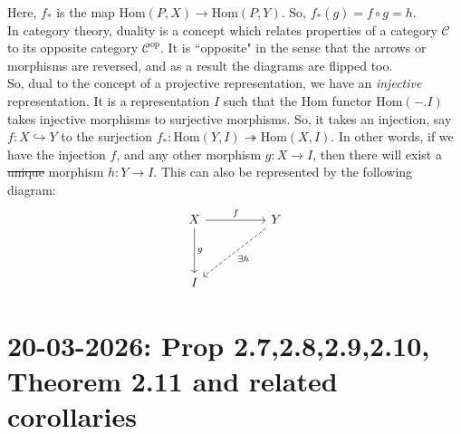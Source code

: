 \documentclass[12pt]{article}
\begin{document}
Here, $f_*$ is the map  $\text{Hom}(P,X) \to \text{Hom}(P,Y)$. So, $f_*(g)=f \circ g=h$. \\

 In category theory, duality is a concept which relates properties of a category $\mathscr{C}$ to its opposite category $\mathscr{C}^\text{op}$. It is ``opposite" in the sense that the arrows or morphisms are reversed, and as a result the diagrams are flipped too.\\

 So, dual to the concept of a projective representation, we have an \textit{injective} representation. It is a representation $I$ such that the Hom functor Hom$(-.I)$ takes injective morphisms to surjective morphisms. So, it takes an injection, say $f: X\hookrightarrow Y$ to the surjection $f_*:\text{Hom}(Y,I) \twoheadrightarrow\text{Hom}(X,I)$. In other words, if we have the injection $f$, and any other morphism $g:X \to I$, then there will exist a \sout{unique} morphism $h:Y \to I$. This can also be represented by the following diagram:\\

 \[
 \begin{tikzcd}[row sep=huge, column sep=huge]
     X \arrow[r,"f"] \arrow[d,"g"]  &Y \arrow[dl,dashed, "\exists h"] \\
     I
     \end{tikzcd}
 \]
 \section*{20-03-2026: Prop 2.7,2.8,2.9,2.10, Theorem 2.11 and related corollaries}
\end{document}
